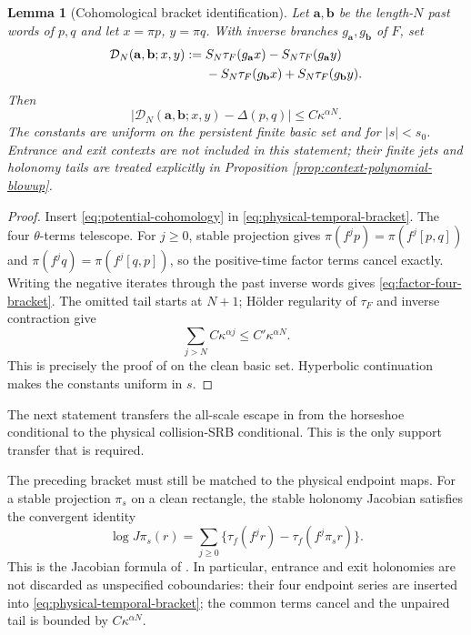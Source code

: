 \documentclass[11pt]{article}
\newtheorem{lemma}[theorem]{Lemma}
\begin{document}
\begin{lemma}[Cohomological bracket identification]
\label{lem:cohomological-bracket-identification}
Let $\mathbf a,\mathbf b$ be the length-$N$ past words of $p,q$ and let
$x=\pi p$, $y=\pi q$.  With inverse branches $g_{\mathbf a},g_{\mathbf b}$
of $F$, set
\begin{align}
 \mathcal D_N(\mathbf a,\mathbf b;x,y)
  :={}&S_N\tau_F(g_{\mathbf a}x)-S_N\tau_F(g_{\mathbf a}y)\notag\\
      &-S_N\tau_F(g_{\mathbf b}x)+S_N\tau_F(g_{\mathbf b}y).
\label{eq:factor-four-bracket}
\end{align}
Then
\begin{equation}
\label{eq:bracket-tail}
 |\mathcal D_N(\mathbf a,\mathbf b;x,y)-\Delta(p,q)|
 \le C\kappa^{\alpha N}.
\end{equation}
 The constants are uniform on the persistent finite basic set and for
 $|s|<s_0$.  Entrance and exit contexts are not included in this statement;
 their finite jets and holonomy tails are treated explicitly in Proposition
 \ref{prop:context-polynomial-blowup}.
\end{lemma}

\begin{proof}
Insert \eqref{eq:potential-cohomology} in
\eqref{eq:physical-temporal-bracket}.  The four $\theta$-terms telescope.
For $j\ge0$, stable projection gives
$\pi(f^jp)=\pi(f^j[p,q])$ and
$\pi(f^jq)=\pi(f^j[q,p])$, so the positive-time factor terms cancel
exactly.  Writing the negative iterates through the past inverse words gives
\eqref{eq:factor-four-bracket}.  The omitted tail starts at $N+1$; H\"older
regularity of $\tau_F$ and inverse contraction give
\[
 \sum_{j>N}C\kappa^{\alpha j}\le C'\kappa^{\alpha N}.
\]
 This is precisely the proof of \cite[Lemma~3.15]{Leclerc2026} on the clean
 basic set.  Hyperbolic continuation makes the constants uniform in $s$.
\end{proof}

The next statement transfers the all-scale escape in
\cite[Propositions~4.31--4.32]{Leclerc2026} from the horseshoe conditional to
the physical collision-SRB conditional.  This is the only support transfer
that is required.

The preceding bracket must still be matched to the physical endpoint maps.
For a stable projection $\pi_s$ on a clean rectangle, the stable holonomy
Jacobian satisfies the convergent identity
\begin{equation}
\label{eq:exact-holonomy-series}
 \log J\pi_s(r)=\sum_{j\ge0}
 \{\tau_f(f^jr)-\tau_f(f^j\pi_s r)\}.
\end{equation}
This is the Jacobian formula of \cite[Lemma~C.1]{Leclerc2026}.  In particular,
entrance and exit holonomies are not discarded as unspecified coboundaries:
their four endpoint series are inserted into \eqref{eq:physical-temporal-bracket};
the common terms cancel and the unpaired tail is bounded by
$C\kappa^{\alpha N}$.
\end{document}
